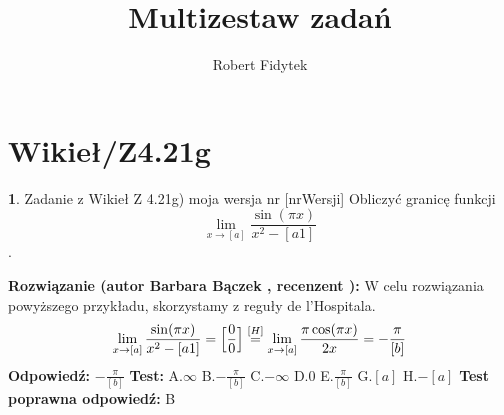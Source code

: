 \documentclass[12pt, a4paper]{article}
\title{Multizestaw zadań}
\author{Robert Fidytek}
\date{}
\theoremstyle{definition} %
\newtheorem{zad}{}
\newcommand{\kategoria}[1]{\section{#1}} %
\newcommand{\zadStart}[1]{\begin{zad}#1\newline} %
\newcommand{\zadStop}{\end{zad}}   %
\newcommand{\rozwStart}[2]{\noindent \textbf{Rozwiązanie (autor #1 , recenzent #2): }\newline} %
\newcommand{\rozwStop}{\newline}                                            %
\newcommand{\odpStart}{\noindent \textbf{Odpowiedź:}\newline}    %
\newcommand{\odpStop}{\newline}                                             %
\newcommand{\testStart}{\noindent \textbf{Test:}\newline} %
\newcommand{\testStop}{\newline} %
\newcommand{\kluczStart}{\noindent \textbf{Test poprawna odpowiedź:}\newline} %
\newcommand{\kluczStop}{\newline} %
\begin{document}
\maketitle


\kategoria{Wikieł/Z4.21g}
\zadStart{Zadanie z Wikieł Z 4.21g) moja wersja nr [nrWersji]}
Obliczyć granicę funkcji $$ \lim_{x \rightarrow [a]} \frac{\sin(\pi x)}{x^2- [a1]}$$.
\zadStop
\rozwStart{Barbara Bączek}{}
W celu rozwiązania powyższego przykładu, skorzystamy z reguły de l'Hospitala.
$$\lim_{x \rightarrow [a]} \frac{\sin(\pi x)}{x^2- [a1]}= \Big{[} \frac{0}{0}\Big{]} \stackrel{[H]}{=}\lim_{x \rightarrow [a]} \frac{\pi \cos(\pi x)}{2x} = -\frac{\pi}{[b]}$$
\rozwStop
\odpStart
$-\frac{\pi}{[b]}$
\odpStop
\testStart
A.$\infty$
B.$-\frac{\pi}{[b]}$
C.$-\infty$
D.$0$
E.$\frac{\pi}{[b]}$
G.$[a]$
H.$-[a]$
\testStop
\kluczStart
B
\kluczStop
\end{document}
